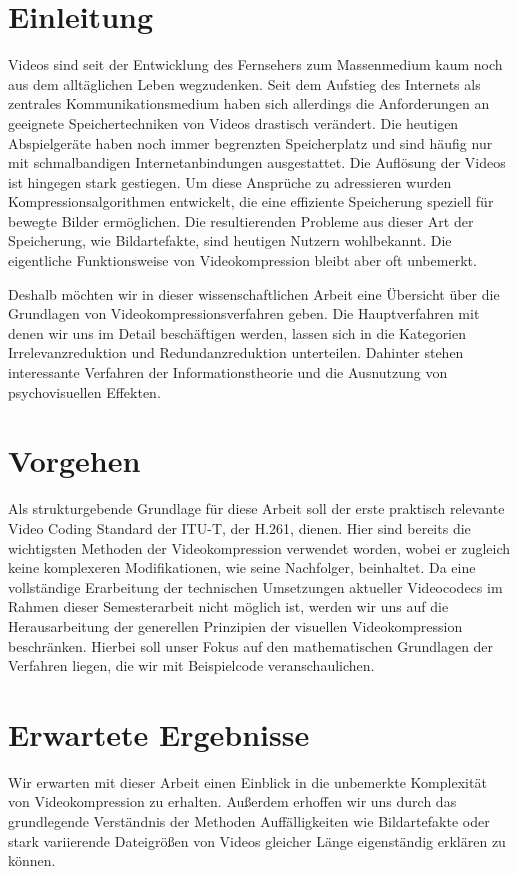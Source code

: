 \section{Einleitung}


Videos sind seit der Entwicklung des Fernsehers zum Massenmedium kaum noch aus dem alltäglichen Leben wegzudenken. Seit dem Aufstieg des Internets als zentrales Kommunikationsmedium haben sich allerdings die Anforderungen an geeignete Speichertechniken von Videos drastisch verändert. Die heutigen Abspielgeräte haben noch immer begrenzten Speicherplatz und sind häufig nur mit schmalbandigen Internetanbindungen ausgestattet. Die Auflösung der Videos ist hingegen stark gestiegen. Um diese Ansprüche zu adressieren wurden Kompressionsalgorithmen entwickelt, die eine effiziente Speicherung speziell für bewegte Bilder ermöglichen. Die resultierenden Probleme aus dieser Art der Speicherung, wie Bildartefakte, sind heutigen Nutzern wohlbekannt. Die eigentliche Funktionsweise von Videokompression bleibt aber oft unbemerkt.

Deshalb möchten wir in dieser wissenschaftlichen Arbeit eine Übersicht über die Grundlagen von Videokompressionsverfahren geben. Die Hauptverfahren mit denen wir uns im Detail beschäftigen werden, lassen sich in die Kategorien Irrelevanzreduktion und Redundanzreduktion unterteilen. Dahinter stehen interessante Verfahren der Informationstheorie und die Ausnutzung von psychovisuellen Effekten. %

\section{Vorgehen}

Als strukturgebende Grundlage für diese Arbeit soll der erste praktisch relevante Video Coding Standard der ITU-T, der H.261, dienen. Hier sind bereits die wichtigsten Methoden der Videokompression verwendet worden, wobei er zugleich keine komplexeren Modifikationen, wie seine Nachfolger, beinhaltet. Da eine vollständige Erarbeitung der technischen Umsetzungen aktueller Videocodecs im Rahmen dieser Semesterarbeit nicht möglich ist, werden wir uns auf die Herausarbeitung der generellen Prinzipien der visuellen Videokompression beschränken. Hierbei soll unser Fokus auf den mathematischen Grundlagen der Verfahren liegen, die wir mit Beispielcode veranschaulichen.

\section{Erwartete Ergebnisse}

Wir erwarten mit dieser Arbeit einen Einblick in die unbemerkte Komplexität von Videokompression zu erhalten. Außerdem erhoffen wir uns durch das grundlegende Verständnis der Methoden Auffälligkeiten wie Bildartefakte oder stark variierende Dateigrößen von Videos gleicher Länge eigenständig erklären zu können.